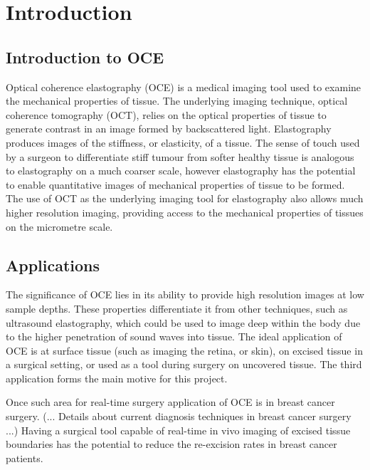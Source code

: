 \chapter{Introduction}

\section{Introduction to OCE}
Optical coherence elastography (OCE) is a medical imaging tool used to examine the mechanical properties of tissue. The underlying imaging technique, optical coherence tomography (OCT), relies on the optical properties of tissue to generate contrast in an image formed by backscattered light. Elastography produces images of the stiffness, or elasticity, of a tissue. The sense of touch used by a surgeon to differentiate stiff tumour from softer healthy tissue is analogous to elastography on a much coarser scale, however elastography has the potential to enable quantitative images of mechanical properties of tissue to be formed. The use of OCT as the underlying imaging tool for elastography also allows much higher resolution imaging, providing access to the mechanical properties of tissues on the micrometre scale. 

\section{Applications}
The significance of OCE lies in its ability to provide high resolution images at low sample depths. These properties differentiate it from other techniques, such as ultrasound elastography, which could be used to image deep within the body due to the higher penetration of sound waves into tissue. The ideal application of OCE is at surface tissue (such as imaging the retina, or skin), on excised tissue in a surgical setting, or used as a tool during surgery on uncovered tissue. The third application forms the main motive for this project.

Once such area for real-time surgery application of OCE is in breast cancer surgery. (... Details about current diagnosis techniques in breast cancer surgery ...) Having a surgical tool capable of real-time in vivo imaging of excised tissue boundaries has the potential to reduce the re-excision rates in breast cancer patients.


